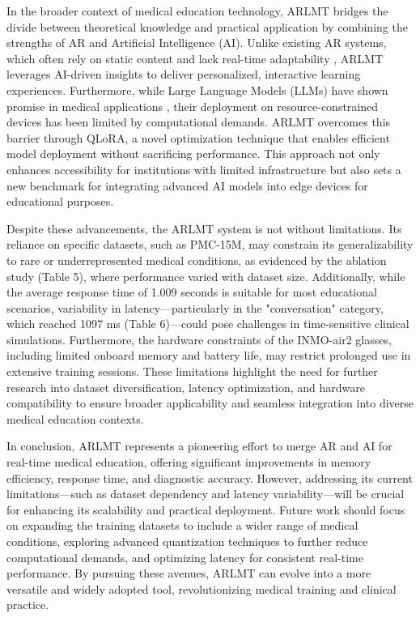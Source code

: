 \documentclass[10pt,letterpaper]{article}
\begin{document}
In the broader context of medical education technology, ARLMT bridges the divide between theoretical knowledge and practical application by combining the strengths of AR and Artificial Intelligence (AI). Unlike existing AR systems, which often rely on static content and lack real-time adaptability \cite{tang2020augmented}, ARLMT leverages AI-driven insights to deliver personalized, interactive learning experiences. Furthermore, while Large Language Models (LLMs) have shown promise in medical applications \cite{singhal2023large}, their deployment on resource-constrained devices has been limited by computational demands. ARLMT overcomes this barrier through QLoRA, a novel optimization technique that enables efficient model deployment without sacrificing performance. This approach not only enhances accessibility for institutions with limited infrastructure but also sets a new benchmark for integrating advanced AI models into edge devices for educational purposes.

Despite these advancements, the ARLMT system is not without limitations. Its reliance on specific datasets, such as PMC-15M, may constrain its generalizability to rare or underrepresented medical conditions, as evidenced by the ablation study (Table 5), where performance varied with dataset size. Additionally, while the average response time of 1.009 seconds is suitable for most educational scenarios, variability in latency—particularly in the "conversation" category, which reached 1097 ms (Table 6)—could pose challenges in time-sensitive clinical simulations. Furthermore, the hardware constraints of the INMO-air2 glasses, including limited onboard memory and battery life, may restrict prolonged use in extensive training sessions. These limitations highlight the need for further research into dataset diversification, latency optimization, and hardware compatibility to ensure broader applicability and seamless integration into diverse medical education contexts.

In conclusion, ARLMT represents a pioneering effort to merge AR and AI for real-time medical education, offering significant improvements in memory efficiency, response time, and diagnostic accuracy. However, addressing its current limitations—such as dataset dependency and latency variability—will be crucial for enhancing its scalability and practical deployment. Future work should focus on expanding the training datasets to include a wider range of medical conditions, exploring advanced quantization techniques to further reduce computational demands, and optimizing latency for consistent real-time performance. By pursuing these avenues, ARLMT can evolve into a more versatile and widely adopted tool, revolutionizing medical training and clinical practice.
\end{document}
